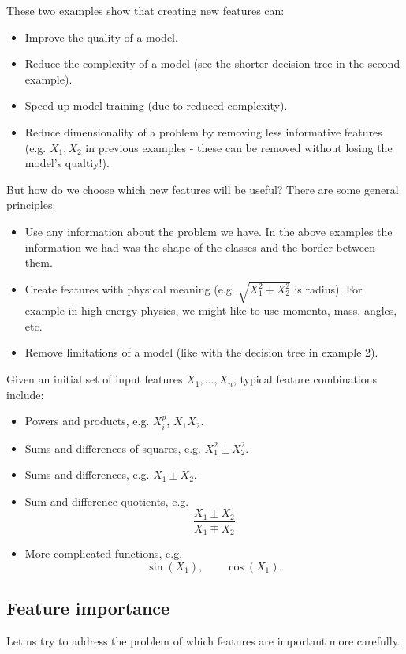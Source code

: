 These two examples show that creating new features can:
\begin{itemize}
\item Improve the quality of a model.
\item Reduce the complexity of a model (see the shorter decision tree in the second example).
\item Speed up model training (due to reduced complexity).
\item Reduce dimensionality of a problem by removing less informative features (e.g. $X_1, X_2$ in previous examples - these can be removed without losing the model's qualtiy!).
\end{itemize}




\newpage
But how do we choose which new features will be useful? There are some general principles:
\begin{itemize}
\item Use any information about the problem we have. In the above examples the information we had was the shape of the classes and the border between them.
\item Create features with physical meaning (e.g. $\sqrt{X_1^2 + X_2^2}$ is radius). For example in high energy physics, we might like to use momenta, mass, angles, etc.
\item Remove limitations of a model (like with the decision tree in example 2).
\end{itemize}

Given an initial set of input features $X_1,...,X_n$, typical feature combinations include:
\begin{itemize}
\item Powers and products, e.g. $X_i^p$, $X_1X_2$.
\item Sums and differences of squares, e.g. $X_1^2 \pm X_2^2$.
\item Sums and differences, e.g. $X_1 \pm X_2$.
\item Sum and difference quotients, e.g.
\begin{equation*}
\frac{X_1 \pm X_2}{X_1 \mp X_2}
\end{equation*}
\item More complicated functions, e.g.
\begin{equation*}
\sin(X_1), \qquad \cos(X_1).
\end{equation*}
\end{itemize}

\minirule

\subsection{Feature importance}
Let us try to address the problem of which features are important more carefully.\\

